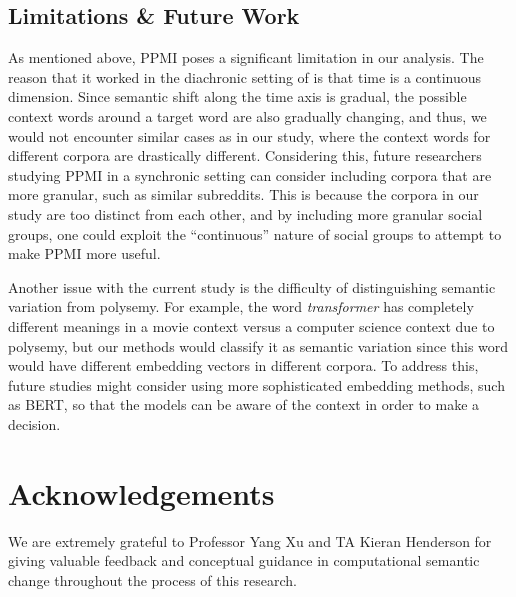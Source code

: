 \documentclass[11pt]{article}
\begin{document}
\subsection{Limitations \& Future Work} \label{sec:limitations}

As mentioned above, PPMI poses a significant limitation in our analysis. The reason that it worked in the diachronic setting of \citet{hamilton2016diachronic} is that time is a continuous dimension. Since semantic shift along the time axis is gradual, the possible context words around a target word are also gradually changing, and thus, we would not encounter similar cases as in our study, where the context words for different corpora are drastically different. Considering this, future researchers studying PPMI in a synchronic setting can consider including corpora that are more granular, such as similar subreddits. This is because the corpora in our study are too distinct from each other, and by including more granular social groups, one could exploit the ``continuous'' nature of social groups to attempt to make PPMI more useful.

Another issue with the current study is the difficulty of distinguishing semantic variation from polysemy. For example, the word \textit{transformer} has completely different meanings in a movie context versus a computer science context due to polysemy, but our methods would classify it as semantic variation since this word would have different embedding vectors in different corpora. To address this, future studies might consider using more sophisticated embedding methods, such as BERT, so that the models can be aware of the context in order to make a decision.

\section{Acknowledgements}

We are extremely grateful to Professor Yang Xu and TA Kieran Henderson for giving valuable feedback and conceptual guidance in computational semantic change throughout the process of this research.


\end{document}
